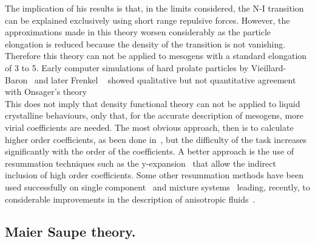 The implication of his results is that, in the limits considered, the N-I transition 
can be explained exclusively using short range repulsive forces. However, the approximations made
in this theory worsen
considerably as the particle elongation is reduced because the density of the transition is not
vanishing. Therefore this theory can not be applied to mesogens with a standard elongation of 3 to
5. Early computer simulations of hard prolate particles by Vieillard-Baron~\cite{VieillardBaron72} and 
later Frenkel \etal~\cite{FrenkelMulder81,FrenkelMulder85} showed qualitative but not 
quantitative agreement with Onsager's theory\\
This does not imply that density functional theory can not be applied to liquid crystalline
behaviours, only that, for the accurate description of mesogens, more virial coefficients are
needed. The most obvious approach, then is to calculate higher order coefficients, as
been done in~\cite{Vega97,VelascoPadila94}, but the difficulty of the task increases
significantly with the order of the coefficients. A better approach is the use of resummation
techniques such as the y-expansion~\cite{MulderFrenkel85,TjiptoMargoEvans90} that allow the indirect 
inclusion of high order coefficients. Some other resummation methods have been
used successfully on single component~\cite{Parsons79,Williamson95} and 
mixture systems~\cite{StroobantsLekkerkerker84,CampAllen96} leading, recently, to considerable
improvements in the description of anisotropic fluids~\cite{CinacchiSchmid02}.



\subsection{Maier Saupe theory.}


